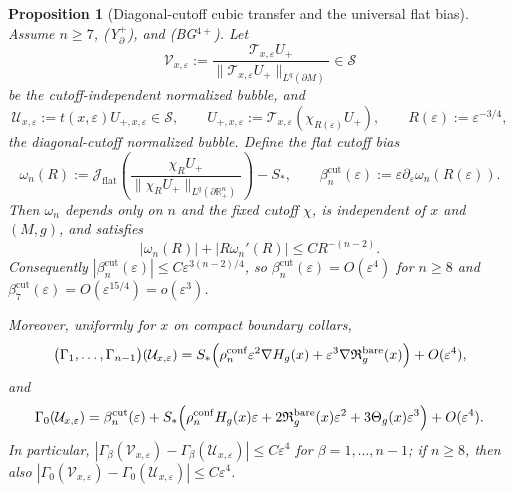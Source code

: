 \documentclass[11pt,reqno,a4paper]{amsart}
\newcommand{\R}{\mathbb{R}}
\numberwithin{equation}{section}
\theoremstyle{plain}
\newtheorem{proposition}[theorem]{Proposition}
\theoremstyle{remark}
\theoremstyle{plain}
\begin{document}
\begin{proposition}[Diagonal-cutoff cubic transfer and the universal flat bias]
\label{prop:cubic-diagonal-transfer}
Assume $n\ge7$, \textup{(Y$^+_{\partial}$)}, and \textup{(BG$^{4+}$)}.
Let
\[
\mathcal V_{x,\varepsilon}
:=\frac{\mathcal T_{x,\varepsilon}U_+}{\|\mathcal T_{x,\varepsilon}U_+\|_{L^q(\partial M)}}\in\mathcal S
\]
be the cutoff-independent normalized bubble, and
\[
\mathcal U_{x,\varepsilon}:=t(x,\varepsilon)U_{+,x,\varepsilon}\in\mathcal S,
\qquad
U_{+,x,\varepsilon}:=\mathcal T_{x,\varepsilon}(\chi_{R(\varepsilon)}U_+),
\qquad
R(\varepsilon):=\varepsilon^{-3/4},
\]
the diagonal-cutoff normalized bubble.
Define the flat cutoff bias
\[
\omega_n(R)
:=
\mathcal J_{\mathrm{flat}}\left(
\frac{\chi_R U_+}{\|\chi_R U_+\|_{L^q(\partial\R^n_+)}}
\right)-S_\ast,
\qquad
\beta_n^{\mathrm{cut}}(\varepsilon)
:=\varepsilon\partial_\varepsilon\omega_n(R(\varepsilon)).
\]
Then $\omega_n$ depends only on $n$ and the fixed cutoff $\chi$,
is independent of $x$ and $(M,g)$, and satisfies
\[
|\omega_n(R)|+|R\omega_n'(R)|\le CR^{-(n-2)}.
\]
Consequently
$|\beta_n^{\mathrm{cut}}(\varepsilon)|\le C\varepsilon^{3(n-2)/4}$, so
$\beta_n^{\mathrm{cut}}(\varepsilon)=O(\varepsilon^4)$ for $n\ge8$ and
$\beta_7^{\mathrm{cut}}(\varepsilon)=O(\varepsilon^{15/4})=o(\varepsilon^3)$.

Moreover, uniformly for $x$ on compact boundary collars,
\begin{equation}\label{eq:cubic-U-center-expansion}
\bigl(\Gamma_1,\dots,\Gamma_{n-1}\bigr)(\mathcal U_{x,\varepsilon})
=
S_\ast\Bigl(\rho_n^{\mathrm{conf}}\varepsilon^2\nabla H_g(x)
+\varepsilon^3\nabla\mathfrak R_g^{\mathrm{bare}}(x)\Bigr)
+O(\varepsilon^4),
\end{equation}
and
\begin{equation}\label{eq:cubic-U-scale-expansion}
\Gamma_0(\mathcal U_{x,\varepsilon})
=
\beta_n^{\mathrm{cut}}(\varepsilon)
+S_\ast\Bigl(\rho_n^{\mathrm{conf}}H_g(x)\varepsilon
+2\mathfrak R_g^{\mathrm{bare}}(x)\varepsilon^2
+3\Theta_g(x)\varepsilon^3\Bigr)
+O(\varepsilon^4).
\end{equation}
In particular,
$|\Gamma_\beta(\mathcal V_{x,\varepsilon})-\Gamma_\beta(\mathcal U_{x,\varepsilon})|
\le C\varepsilon^4$ for $\beta=1,\dots,n-1$;
if $n\ge8$, then also
$|\Gamma_0(\mathcal V_{x,\varepsilon})-\Gamma_0(\mathcal U_{x,\varepsilon})|\le C\varepsilon^4$.
\end{proposition}
\end{document}
